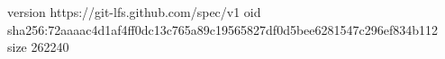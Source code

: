 version https://git-lfs.github.com/spec/v1
oid sha256:72aaaac4d1af4ff0dc13c765a89c19565827df0d5bee6281547c296ef834b112
size 262240
